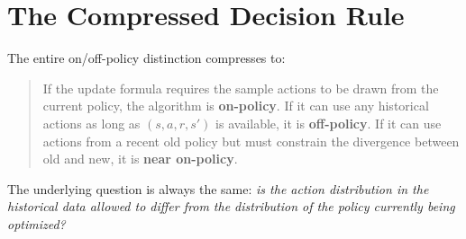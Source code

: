 \section{The Compressed Decision Rule}
\label{sec:compressed-rule}

The entire on/off-policy distinction compresses to:

\begin{quote}
If the update formula requires the sample actions to be drawn from the current policy, the algorithm is \textbf{on-policy}. If it can use any historical actions as long as $(s, a, r, s')$ is available, it is \textbf{off-policy}. If it can use actions from a recent old policy but must constrain the divergence between old and new, it is \textbf{near on-policy}.
\end{quote}

The underlying question is always the same: \emph{is the action distribution in the historical data allowed to differ from the distribution of the policy currently being optimized?}
